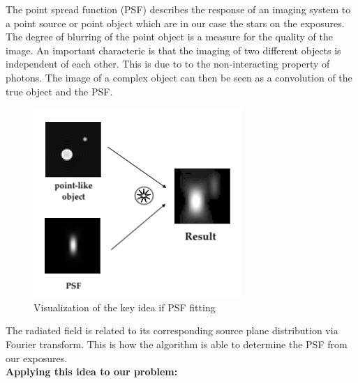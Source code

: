 The point spread function (PSF) describes the response of an imaging system to a point source or point object which are in our case the stars on the exposures. The degree of blurring  of the point object is a measure for the quality of the image.
An important characteric is that the imaging of two different objects is independent of each other. This is due to to the non-interacting property of photons. The image of a complex object can then be seen as a convolution of the true object and the PSF.
\begin{figure}[H]
	\centering
	\includegraphics[scale=0.5]{figures/Introduction/psf}
	\caption{Visualization of the key idea if PSF fitting}
\end{figure}
The radiated field is related to its corresponding source plane distribution via Fourier transform. This is how the algorithm is able to determine the PSF from our exposures. \\

\textbf{Applying this idea to our problem:} \\

